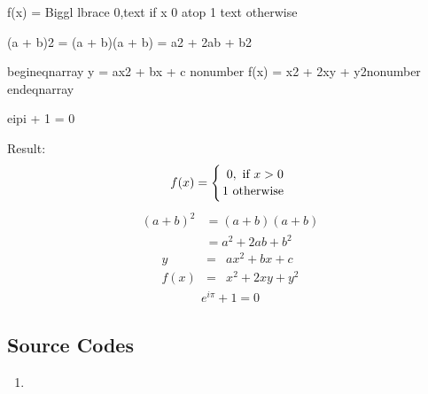 \documentclass[letterpaper,12pt,english]{sphinxmanual}
\begin{document}
\begin{sphinxVerbatim}[commandchars=\\\{\}]
 

        f(x)
        =
        \PYGZbs{}Biggl \PYGZbs{}lbrace
        \PYGZob{}
        0,\PYGZbs{}text\PYGZob{} if \PYGZcb{}
           \PYGZob{} x \PYGZgt{}0\PYGZcb{}
        \PYGZbs{}atop
        1 \PYGZbs{}text\PYGZob{} otherwise \PYGZcb{}
        \PYGZcb{}

 

   (a + b)\PYGZca{}2  \PYGZam{}=  (a + b)(a + b) \PYGZbs{}\PYGZbs{}
              \PYGZam{}=  a\PYGZca{}2 + 2ab + b\PYGZca{}2

 

   \PYGZbs{}begin\PYGZob{}eqnarray\PYGZcb{}
      y    \PYGZam{} = \PYGZam{} ax\PYGZca{}2 + bx + c \PYGZbs{}nonumber\PYGZbs{}\PYGZbs{}
      f(x) \PYGZam{} = \PYGZam{} x\PYGZca{}2 + 2xy + y\PYGZca{}2\PYGZbs{}nonumber
   \PYGZbs{}end\PYGZob{}eqnarray\PYGZcb{}

  e\PYGZca{}\PYGZob{}i\PYGZbs{}pi\PYGZcb{} + 1 = 0
    
\end{sphinxVerbatim}

Result:
\begin{equation*}
\begin{split}f(x)
=
\Biggl \lbrace
{
0,\text{ if }
   { x >0}
\atop
1 \text{ otherwise }
}\end{split}
\end{equation*}\begin{equation*}
\begin{split}(a + b)^2  &=  (a + b)(a + b) \\
           &=  a^2 + 2ab + b^2\end{split}
\end{equation*}\begin{eqnarray}
   y    & = & ax^2 + bx + c \nonumber\\
   f(x) & = & x^2 + 2xy + y^2\nonumber
\end{eqnarray}\begin{equation}\label{equation:rtxt:euler}
\begin{split}e^{i\pi} + 1 = 0\end{split}
\end{equation}

\subsection{Source Codes}
\label{\detokenize{rtxt:source-codes}}\begin{enumerate}
\def\theenumi{\arabic{enumi}}
\def\labelenumi{\theenumi .}
\makeatletter\def\p@enumii{\p@enumi \theenumi .}\makeatother
\item {} 

\end{enumerate}
\end{document}
